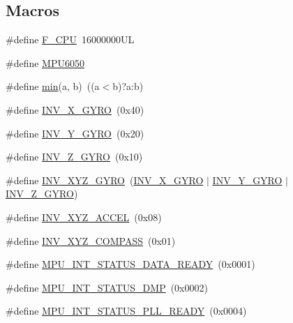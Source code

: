 \subsection*{Macros}
\begin{DoxyCompactItemize}
\item 
\#define \hyperlink{group___d_r_i_v_e_r_s_ga43bafb28b29491ec7f871319b5a3b2f8}{F\+\_\+\+C\+PU}~16000000\+UL
\item 
\#define \hyperlink{group___d_r_i_v_e_r_s_ga6d132f914f18cb144a0eaf36312045c8}{M\+P\+U6050}
\item 
\#define \hyperlink{group___d_r_i_v_e_r_s_gac6afabdc09a49a433ee19d8a9486056d}{min}(a,  b)~((a$<$b)?a\+:b)
\item 
\#define \hyperlink{group___d_r_i_v_e_r_s_gabf02bf28541421d59f8be764f2b95407}{I\+N\+V\+\_\+\+X\+\_\+\+G\+Y\+RO}~(0x40)
\item 
\#define \hyperlink{group___d_r_i_v_e_r_s_gacdd8ff833a34dba08ca2aa145eb92b44}{I\+N\+V\+\_\+\+Y\+\_\+\+G\+Y\+RO}~(0x20)
\item 
\#define \hyperlink{group___d_r_i_v_e_r_s_ga50205b5cc6089b33b2561c854eb8b0fd}{I\+N\+V\+\_\+\+Z\+\_\+\+G\+Y\+RO}~(0x10)
\item 
\#define \hyperlink{group___d_r_i_v_e_r_s_ga3fdc30f9c0a26c2c4e2bb88921f91629}{I\+N\+V\+\_\+\+X\+Y\+Z\+\_\+\+G\+Y\+RO}~(\hyperlink{group___d_r_i_v_e_r_s_gabf02bf28541421d59f8be764f2b95407}{I\+N\+V\+\_\+\+X\+\_\+\+G\+Y\+RO} $\vert$ \hyperlink{group___d_r_i_v_e_r_s_gacdd8ff833a34dba08ca2aa145eb92b44}{I\+N\+V\+\_\+\+Y\+\_\+\+G\+Y\+RO} $\vert$ \hyperlink{group___d_r_i_v_e_r_s_ga50205b5cc6089b33b2561c854eb8b0fd}{I\+N\+V\+\_\+\+Z\+\_\+\+G\+Y\+RO})
\item 
\#define \hyperlink{group___d_r_i_v_e_r_s_gaa03f025a17ed491e70b88274e89c75c5}{I\+N\+V\+\_\+\+X\+Y\+Z\+\_\+\+A\+C\+C\+EL}~(0x08)
\item 
\#define \hyperlink{group___d_r_i_v_e_r_s_ga7fc9c1dbdcb2ac8cc2a4128a5799482a}{I\+N\+V\+\_\+\+X\+Y\+Z\+\_\+\+C\+O\+M\+P\+A\+SS}~(0x01)
\item 
\#define \hyperlink{group___d_r_i_v_e_r_s_ga0cddf0dffaf3bf65fd3ed92dda4f3193}{M\+P\+U\+\_\+\+I\+N\+T\+\_\+\+S\+T\+A\+T\+U\+S\+\_\+\+D\+A\+T\+A\+\_\+\+R\+E\+A\+DY}~(0x0001)
\item 
\#define \hyperlink{group___d_r_i_v_e_r_s_ga380dd1ef256931e99302c371ad7752f4}{M\+P\+U\+\_\+\+I\+N\+T\+\_\+\+S\+T\+A\+T\+U\+S\+\_\+\+D\+MP}~(0x0002)
\item 
\#define \hyperlink{group___d_r_i_v_e_r_s_gaa38d7976e86186bf353cb89ca7561f29}{M\+P\+U\+\_\+\+I\+N\+T\+\_\+\+S\+T\+A\+T\+U\+S\+\_\+\+P\+L\+L\+\_\+\+R\+E\+A\+DY}~(0x0004)

\end{DoxyCompactItemize}
